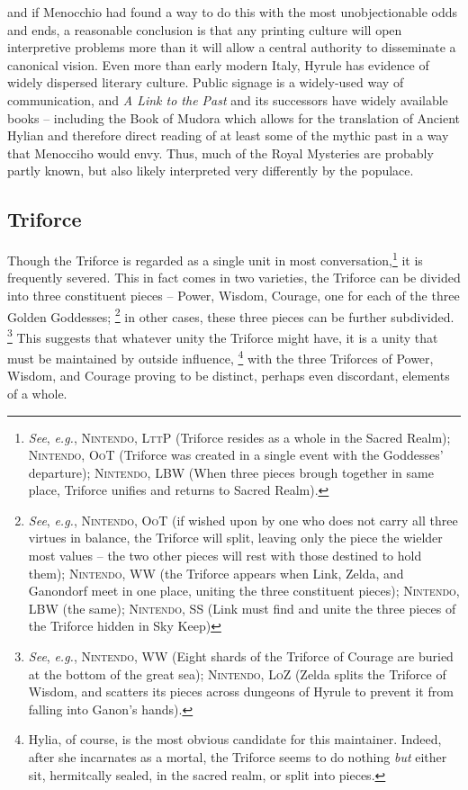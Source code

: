 \documentclass[../FGP.tex]{subfiles}
\begin{document}
and if Menocchio had found a way to do this with the most unobjectionable odds and ends, a reasonable conclusion is that any printing culture will open interpretive problems more than it will allow a central authority to disseminate a canonical vision. Even more than early modern Italy, Hyrule has evidence of widely dispersed literary culture. Public signage is a widely-used way of communication, and \emph{A Link to the Past} and its successors have widely available books -- including the Book of Mudora which allows for the translation of Ancient Hylian and therefore direct reading of at least some of the mythic past in a way that Menocciho would envy. Thus, much of the Royal Mysteries are probably partly known, but also likely interpreted very differently by the populace. 

\subsection{Triforce}Though the Triforce is regarded as a single unit in most conversation,\footnote{\textit{See}, \textit{e.g.}, \textsc{Nintendo, LttP} (Triforce resides as a whole in the Sacred Realm); \textsc{Nintendo, OoT} (Triforce was created in a single event with the Goddesses' departure); \textsc{Nintendo, LBW} (When three pieces brough together in same place, Triforce unifies and returns to Sacred Realm).} it is frequently severed. This in fact comes in two varieties, the Triforce can be divided into three constituent pieces -- Power, Wisdom, Courage, one for each of the three Golden Goddesses;%
  \footnote{\textit{See}, \textit{e.g.}, \textsc{Nintendo, OoT} (if wished upon by one who does not carry all three virtues in balance, the Triforce will split, leaving only the piece the wielder most values -- the two other pieces will rest with those destined to hold them); \textsc{Nintendo, WW} (the Triforce appears when Link, Zelda, and Ganondorf meet in one place, uniting the three constituent pieces); \textsc{Nintendo, LBW} (the same); \textsc{Nintendo, SS} (Link must find and unite the three pieces of the Triforce hidden in Sky Keep)}
in other cases, these three pieces can be further subdivided.%
  \footnote{\textit{See}, \textit{e.g.}, \textsc{Nintendo, WW} (Eight shards of the Triforce of Courage are buried at the bottom of the great sea); \textsc{Nintendo, LoZ} (Zelda splits the Triforce of Wisdom, and scatters its pieces across dungeons of Hyrule to prevent it from falling into Ganon's hands).}
This suggests that whatever unity the Triforce might have, it is a unity that must be maintained by outside influence,%
  \footnote{Hylia, of course, is the most obvious candidate for this maintainer. Indeed, after she incarnates as a mortal, the Triforce seems to do nothing \emph{but} either sit, hermitcally sealed, in the sacred realm, or split into pieces.}
with the three Triforces of Power, Wisdom, and Courage proving to be distinct, perhaps even discordant, elements of a whole. 
\end{document}
